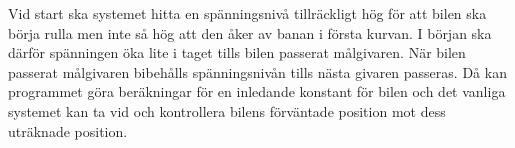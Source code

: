 Vid start ska systemet hitta en spänningsnivå tillräckligt hög för att bilen ska
börja rulla men inte så hög att den åker av banan i första kurvan. I början ska
därför spänningen öka lite i taget tills bilen passerat målgivaren. När bilen
passerat målgivaren bibehålls spänningsnivån tills nästa givaren passeras.
Då kan programmet göra beräkningar för en inledande konstant för bilen och
det vanliga systemet kan ta vid och kontrollera bilens förväntade position mot
dess uträknade position.
